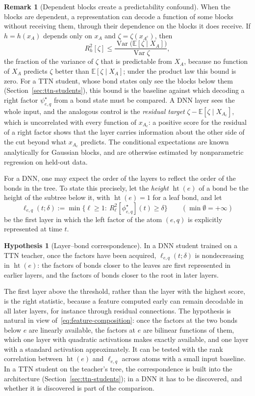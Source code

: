 \documentclass[11pt]{article}
\newcommand{\E}{\mathbb{E}}
\newcommand{\Var}{\operatorname{Var}}
\theoremstyle{definition}
\newtheorem{remark}[theorem]{Remark}
\newtheorem{hypothesis}[theorem]{Hypothesis}
\numberwithin{equation}{section}
\begin{document}
\begin{remark}[Dependent blocks create a predictability confound]\label{rem:probe-dependence}
When the blocks are dependent, a representation can decode a function of some blocks without receiving them, through their dependence on the blocks it does receive. If $h=h(x_A)$ depends only on $x_A$ and $\zeta=\zeta(x_{A^c})$, then
\[
R^2_h[\zeta]\le\frac{\Var\big(\E[\zeta\mid X_A]\big)}{\Var\zeta},
\]
the fraction of the variance of $\zeta$ that is predictable from $X_A$, because no function of $X_A$ predicts $\zeta$ better than $\E[\zeta\mid X_A]$; under the product law this bound is zero. For a TTN student, whose bond states only see the blocks below them (Section~\ref{sec:ttn-students}), this bound is the baseline against which decoding a right factor $\psi^\star_{e,q}$ from a bond state must be compared. A DNN layer sees the whole input, and the analogous control is the \emph{residual target} $\zeta-\E[\zeta\mid X_{A_e}]$, which is uncorrelated with every function of $x_{A_e}$: a positive score for the residual of a right factor shows that the layer carries information about the other side of the cut beyond what $x_{A_e}$ predicts. The conditional expectations are known analytically for Gaussian blocks, and are otherwise estimated by nonparametric regression on held-out data.
\end{remark}

For a DNN, one may expect the order of the layers to reflect the order of the bonds in the tree. To state this precisely, let the \emph{height} $\operatorname{ht}(e)$ of a bond be the height of the subtree below it, with $\operatorname{ht}(e)=1$ for a leaf bond, and let
\[
\ell_{e,q}(t;\delta):=\min\big\{\ell\ge1:\ R^2_\ell[\phi^\star_{e,q}](t)\ge\delta\big\}\qquad(\min\emptyset=+\infty)
\]
be the first layer in which the left factor of the atom $(e,q)$ is explicitly represented at time $t$.

\begin{hypothesis}[Layer--bond correspondence]\label{hyp:layer-bond}
In a DNN student trained on a TTN teacher, once the factors have been acquired, $\ell_{e,q}(t;\delta)$ is nondecreasing in $\operatorname{ht}(e)$: the factors of bonds closer to the leaves are first represented in earlier layers, and the factors of bonds closer to the root in later layers.
\end{hypothesis}

The first layer above the threshold, rather than the layer with the highest score, is the right statistic, because a feature computed early can remain decodable in all later layers, for instance through residual connections. The hypothesis is natural in view of~\eqref{eq:feature-composition}: once the factors at the two bonds below $e$ are linearly available, the factors at $e$ are bilinear functions of them, which one layer with quadratic activations makes exactly available, and one layer with a standard activation approximately. It can be tested with the rank correlation between $\operatorname{ht}(e)$ and $\ell_{e,q}$ across atoms with a small input baseline. In a TTN student on the teacher's tree, the correspondence is built into the architecture (Section~\ref{sec:ttn-students}); in a DNN it has to be discovered, and whether it is discovered is part of the comparison.
\end{document}
